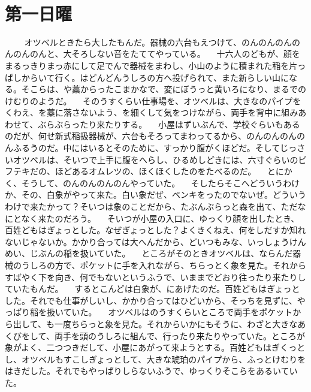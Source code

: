 　
\section*{第一日曜}
　
　オツベルときたら大したもんだ。器械の六台もえつけて、のんのんのんのんのんのんと、大そろしない音をたててやっている。
　十六人のどもが、顔をまるっきりまっ赤にして足でんで器械をまわし、小山のように積まれた稲を片っぱしからいて行く。はどんどんうしろの方へ投げられて、また新らしい山になる。そこらは、や藁からったこまかなで、変にぼうっと黄いろになり、まるでのけむりのようだ。
　そのうすくらい仕事場を、オツベルは、大きなのパイプをくわえ、を藁に落さないよう、を細くして気をつけながら、両手を背中に組みあわせて、ぶらぶらったり来たりする。
　小屋はずいぶんで、学校ぐらいもあるのだが、何せ新式稲扱器械が、六台もそろってまわってるから、のんのんのんのんふるうのだ。中にはいるとそのために、すっかり腹がくほどだ。そしてじっさいオツベルは、そいつで上手に腹をへらし、ひるめしどきには、六寸ぐらいのビフテキだの、ほどあるオムレツの、ほくほくしたのをたべるのだ。
　とにかく、そうして、のんのんのんのんやっていた。
　そしたらそこへどういうわけか、その、白象がやって来た。白い象だぜ、ペンキをったのでないぜ。どういうわけで来たかって？{}そいつは象のことだから、たぶんぶらっと森を出て、ただなにとなく来たのだろう。
　そいつが小屋の入口に、ゆっくり顔を出したとき、百姓どもはぎょっとした。なぜぎょっとした？{}よくきくねえ、何をしだすか知れないじゃないか。かかり合っては大へんだから、どいつもみな、いっしょうけんめい、じぶんの稲を扱いていた。
　ところがそのときオツベルは、ならんだ器械のうしろの方で、ポケットに手を入れながら、ちらっとく象を見た。それからすばやく下を向き、何でもないというふうで、いままでどおり往ったり来たりしていたもんだ。
　するとこんどは白象が、にあげたのだ。百姓どもはぎょっとした。それでも仕事がしいし、かかり合ってはひどいから、そっちを見ずに、やっぱり稲を扱いていた。
　オツベルはのうすくらいところで両手をポケットから出して、も一度ちらっと象を見た。それからいかにもそうに、わざと大きなあくびをして、両手を頭のうしろに組んで、行ったり来たりやっていた。ところが象がよく、二つつきだして、小屋にあがって来ようとする。百姓どもはぎくっとし、オツベルもすこしぎょっとして、大きな琥珀のパイプから、ふっとけむりをはきだした。それでもやっぱりしらないふうで、ゆっくりそこらをあるいていた。
